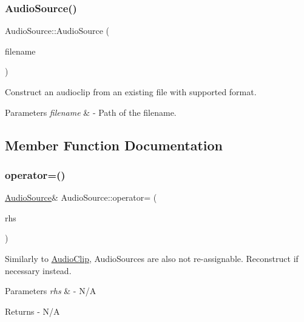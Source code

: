 \subsubsection{\texorpdfstring{Audio\+Source()}{AudioSource()}}
{\footnotesize\ttfamily Audio\+Source\+::\+Audio\+Source (\begin{DoxyParamCaption}\item[{std\+::string}]{filename }\end{DoxyParamCaption})}

Construct an audioclip from an existing file with supported format. 
\begin{DoxyParams}{Parameters}
{\em filename} & -\/ Path of the filename. \\
\hline
\end{DoxyParams}


\subsection{Member Function Documentation}
\mbox{\label{class_audio_source_aa73e35b3259f93e55a897b4c42e198d8}} 
\subsubsection{\texorpdfstring{operator=()}{operator=()}}
{\footnotesize\ttfamily \mbox{\hyperlink{class_audio_source}{Audio\+Source}}\& Audio\+Source\+::operator= (\begin{DoxyParamCaption}\item[{const \mbox{\hyperlink{class_audio_source}{Audio\+Source}} \&}]{rhs }\end{DoxyParamCaption})\hspace{0.3cm}{\ttfamily [delete]}}

Similarly to \mbox{\hyperlink{class_audio_clip}{Audio\+Clip}}, Audio\+Sources are also not re-\/assignable. Reconstruct if necessary instead. 
\begin{DoxyParams}{Parameters}
{\em rhs} & -\/ N/A \\
\hline
\end{DoxyParams}
\begin{DoxyReturn}{Returns}
-\/ N/A 
\end{DoxyReturn}
\mbox{\label{class_audio_source_acc045186f5f7516c3b71598f0b65b0c5}} 
